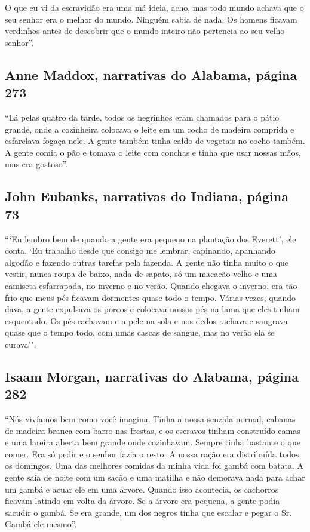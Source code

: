 O que eu vi da escravidão era uma má ideia, acho, mas todo mundo achava
que o seu senhor era o melhor do mundo. Ninguém sabia de nada. Os homens
ficavam verdinhos antes de descobrir que o mundo inteiro não pertencia
ao seu velho senhor''.

\subsection{Anne Maddox, narrativas do Alabama, página 273}
\label{ref179}

``Lá pelas quatro da tarde, todos os negrinhos eram chamados para o
pátio grande, onde a cozinheira colocava o leite em um cocho de madeira
comprida e esfarelava fogaça nele. A gente também tinha caldo de
vegetais no cocho também. A gente comia o pão e tomava o leite com
conchas e tinha que usar nossas mãos, mas era gostoso''.

\subsection{John Eubanks, narrativas do Indiana, página 73} \label{ref83}

```Eu lembro bem de quando a gente era pequeno na plantação dos
Everett', ele conta. `Eu trabalho desde que consigo me lembrar,
capinando, apanhando algodão e fazendo outras tarefas pela fazenda. A
gente não tinha muito o que vestir, nunca roupa de baixo, nada de
sapato, só um macacão velho e uma camiseta esfarrapada, no inverno e no
verão. Quando chegava o inverno, era tão frio que meus pés ficavam
dormentes quase todo o tempo. Várias vezes, quando dava, a gente
expulsava os porcos e colocava nossos pés na lama que eles tinham
esquentado. Os pés rachavam e a pele na sola e nos dedos rachava e
sangrava quase que o tempo todo, com umas cascas de sangue, mas no verão
ela se curava'".

\subsection{Isaam Morgan, narrativas do Alabama, página 282}
\label{ref200}

``Nós vivíamos bem como você imagina. Tinha a nossa senzala normal,
cabanas de madeira branca com barro nas frestas, e os escravos tinham
construído camas e uma lareira aberta bem grande onde cozinhavam. Sempre
tinha bastante o que comer. Era só pedir e o senhor fazia o resto. A
nossa ração era distribuída todos os domingos. Uma das melhores comidas
da minha vida foi gambá com batata. A gente saía de noite com um sacão e
uma matilha e não demorava nada para achar um gambá e acuar ele em uma
árvore. Quando isso acontecia, os cachorros ficavam latindo em volta da
árvore. Se a árvore era pequena, a gente podia sacudir o gambá. Se era
grande, um dos negros tinha que escalar e pegar o Sr. Gambá ele mesmo''.

